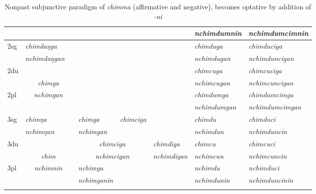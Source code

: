 \begin{landscape}
\begin{table}
{{\begin{tabular}{|l||p{2.4cm}|p{2.0cm}|p{2.6cm}|p{2.6cm}|p{2.6cm}|p{3.2cm}|p{3.2cm}|}
		&  \multicolumn{2}{c|}{\cellcolor[gray]{.8} }& \multicolumn{3}{c|}{\cellcolor[gray]{.8} }& \it nchimdumnin & \it  nchimdumcimnin\\
\hline				
{\sc 2sg }		& \it 	chimdaŋga  & \it 	    &\multicolumn{3}{c|}{ \cellcolor[gray]{.8}}& \it  chimduga & \it    chimduciga\\
		& \it   nchimdaŋgan & \it   & \multicolumn{3}{c|}{\cellcolor[gray]{.8} }& \it  nchimdugan & \it nchimduncigan  \\
 \cline{1-2} \cline{7-8}			
{\sc 2du}		&	\multicolumn{2}{c|}{}     &  \multicolumn{3}{c|}{\cellcolor[gray]{.8}} & \it  chimcuga  & \it   chimcuciga \\
		& 	\multicolumn{2}{c|}{\it chimga} & \multicolumn{3}{c|}{\cellcolor[gray]{.8} }& \it nchimcugan  & \it  nchimcuncigan \\
 \cline{1-1} \cline{7-8}			
{\sc 2pl}		& 	\multicolumn{2}{c|}{\it nchimgan} &  \multicolumn{3}{c|}{ \cellcolor[gray]{.8}}& \it  chimdumga& \it  chimdumcimga  \\
		& 	\multicolumn{2}{c|}{ }& \multicolumn{3}{c|}{\cellcolor[gray]{.8} }& \it  nchimdumgan & \it  nchimdumcimgan \\
\hline			
{\sc 3sg} 		& \it chimŋa	  & \it 	      	& \it   chimga	 	& \it   chimciga	  & \it     	& \it chimdu& \it chimduci\\
		& \it  nchimŋan   & \it    	& \it nchimgan& \it  & \it    								& \it nchimdun& \it nchimduncin\\
  \cline{1-2}  \cline{4-4} \cline{7-8}					
{\sc 3du}& \multicolumn{2}{c|}{}& \multicolumn{2}{c|}{\it chimciga}& \it chimdiga& \it   chimcu & \it   chimcuci\\
	&  \multicolumn{2}{c|}{\it chim}			&   \multicolumn{2}{c|}{\it nchimcigan} & \it  nchimdigan & \it  nchimcun & \it  nchimcuncin\\
 \cline{1-1} \cline{4-4} \cline{7-8}	
{\sc 3pl} & \multicolumn{2}{c|}{\it nchimnin}	& \it nchimga& \it  & \it  & \it nchimdu& \it nchimduci\\	
	& \multicolumn{2}{c|}{ }				& \it nchimganin& \it & \it  						& \it nchimdunin& \it nchimduncinin \\
\lspbottomrule
\end{tabular}
}
}
\caption{Nonpast subjunctive paradigm of \emph{chimma}  (affirmative and negative), becomes optative by addition of \emph{-ni}}\label{par-chimd-sbjv}
\end{table}
\end{landscape}
 
